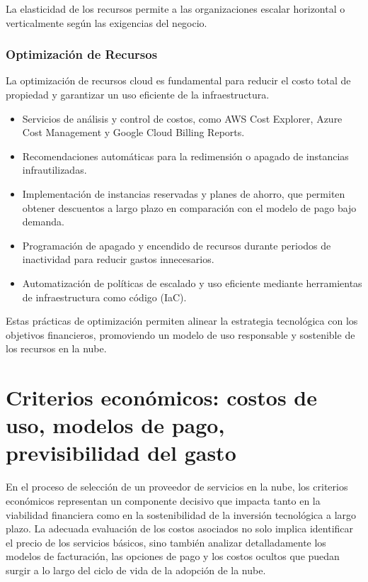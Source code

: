 {                La elasticidad de los recursos permite a las organizaciones escalar horizontal o verticalmente según las exigencias del negocio.
                
            \subsubsection{Optimización de Recursos}
                La optimización de recursos cloud es fundamental para reducir el costo total de propiedad y garantizar un uso eficiente de la infraestructura.
                
                \begin{itemize}
                    \item Servicios de análisis y control de costos, como AWS Cost Explorer, Azure Cost Management y Google Cloud Billing Reports.
                    \item Recomendaciones automáticas para la redimensión o apagado de instancias infrautilizadas.
                    \item Implementación de instancias reservadas y planes de ahorro, que permiten obtener descuentos a largo plazo en comparación con el modelo de pago bajo demanda.
                    \item Programación de apagado y encendido de recursos durante periodos de inactividad para reducir gastos innecesarios.
                    \item Automatización de políticas de escalado y uso eficiente mediante herramientas de infraestructura como código (IaC).
                \end{itemize}
                
                Estas prácticas de optimización permiten alinear la estrategia tecnológica con los objetivos financieros, promoviendo un modelo de uso responsable y sostenible de los recursos en la nube.

    \section[Criterios económicos]{Criterios económicos: costos de uso, modelos de pago, previsibilidad del gasto}
        En el proceso de selección de un proveedor de servicios en la nube, los criterios económicos representan un componente decisivo que impacta tanto en la viabilidad financiera como en la sostenibilidad de la inversión tecnológica a largo plazo. La adecuada evaluación de los costos asociados no solo implica identificar el precio de los servicios básicos, sino también analizar detalladamente los modelos de facturación, las opciones de pago y los costos ocultos que puedan surgir a lo largo del ciclo de vida de la adopción de la nube.

}
